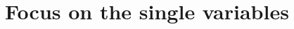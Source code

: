 \documentclass{article}
\begin{document}
% 
% 
%
%
%
%
%
%
%

%
%
\section{Focus on the single variables}
%
\end{document}
